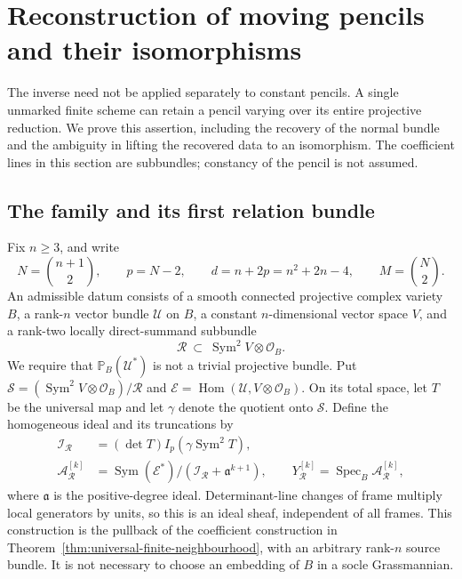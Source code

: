 \documentclass[11pt,reqno]{amsart}
\numberwithin{equation}{section}
\theoremstyle{definition}\newtheorem{definition}[theorem]{Definition}
\theoremstyle{remark}\newtheorem{remark}[theorem]{Remark}
\newcommand{\Pj}{\mathbb P}\newcommand{\A}{\mathbb A}
\newcommand{\OO}{\mathcal O}\newcommand{\II}{\mathcal I}
\DeclareMathOperator{\Sym}{Sym}\DeclareMathOperator{\Gr}{Gr}
\DeclareMathOperator{\Hom}{Hom}\DeclareMathOperator{\Tot}{Tot}
\DeclareMathOperator{\Spec}{Spec}\DeclareMathOperator{\PGL}{PGL}
\begin{document}
\section{Reconstruction of moving pencils and their isomorphisms}
\label{sec:moving-pencils-v146}

The inverse need not be applied separately to constant pencils.  A single
unmarked finite scheme can retain a pencil varying over its entire
projective reduction.  We prove this assertion, including the recovery
of the normal bundle and the ambiguity in lifting the recovered data to
an isomorphism.  The coefficient lines in this section are subbundles;
constancy of the pencil is not assumed.

\subsection{The family and its first relation bundle}
Fix \(n\ge3\), and write
\[
 N=\binom{n+1}{2},\qquad p=N-2,\qquad
 d=n+2p=n^2+2n-4,\qquad M=\binom N2.
\]
An admissible datum consists of a smooth connected projective complex
variety \(B\), a rank-\(n\) vector bundle \(\mathcal U\) on \(B\), a
constant \(n\)-dimensional vector space \(V\), and a rank-two locally
direct-summand subbundle
\[
 \mathcal R\ \subset\ \Sym^2V\otimes\OO_B.
\]
We require that \(\Pj_B(\mathcal U^*)\) is not a trivial projective
bundle.  Put \(\mathcal S=(\Sym^2V\otimes\OO_B)/\mathcal R\) and
\(\mathcal E=\Hom(\mathcal U,V\otimes\OO_B)\).  On its total space,
let \(T\) be the universal map and let \(\gamma\) denote the quotient
onto \(\mathcal S\).  Define the homogeneous ideal and its truncations by
\begin{equation}\label{eq:moving-construction-v146}
 \begin{split}
 \mathcal I_{\mathcal R}&=(\det T)I_p(\gamma\Sym^2T),\\
 \mathcal A_{\mathcal R}^{[k]}
   &=\Sym(\mathcal E^*)/
       (\mathcal I_{\mathcal R}+\mathfrak a^{k+1}),\qquad
 Y_{\mathcal R}^{[k]}=\Spec_B\mathcal A_{\mathcal R}^{[k]},
 \end{split}
\end{equation}
where \(\mathfrak a\) is the positive-degree ideal.  Determinant-line
changes of frame multiply local generators by units, so this is an
ideal sheaf, independent of all frames.  This construction is the
pullback of the coefficient construction in
Theorem~\ref{thm:universal-finite-neighbourhood}, with an arbitrary
rank-\(n\) source bundle.  It is not necessary to choose an embedding
of \(B\) in a socle Grassmannian.
\end{document}
